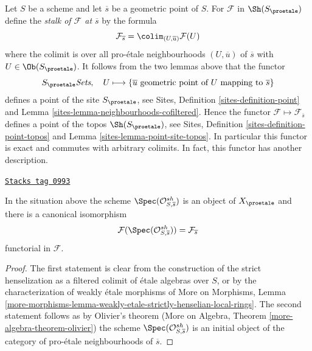Let $S$ be a scheme and let $\overline{s}$ be a geometric point of $S$.
For $\mathcal{F}$ in $\Sh(S_\proetale)$ define the
{\it stalk of $\mathcal{F}$ at $\overline{s}$} by the formula
$$
\mathcal{F}_{\overline{s}} = \colim_{(U, \overline{u})} \mathcal{F}(U)
$$
where the colimit is over all pro-\'etale neighbourhoods $(U, \overline{u})$
of $\overline{s}$ with $U \in \Ob(S_\proetale)$. It follows from the
two lemmas above that the functor
$$
S_\proetale \textit{Sets},\quad
U \longmapsto
\{\overline{u}\text{ geometric point of }U\text{ mapping to }\overline{s}\}
$$
defines a point of the site $S_\proetale$, see
Sites, Definition \ref{sites-definition-point} and
Lemma \ref{sites-lemma-neighbourhoods-cofiltered}.
Hence the functor $\mathcal{F} \mapsto \mathcal{F}_{\overline{s}}$
defines a point of the topos $\Sh(S_\proetale)$, see
Sites, Definition \ref{sites-definition-point-topos} and
Lemma \ref{sites-lemma-point-site-topos}. In particular this
functor is exact and commutes with arbitrary colimits.
In fact, this functor has another description.

\begin{lemma}
\label{proetale-lemma-classical-point}
\href{https://stacks.math.columbia.edu/tag/0993}{\texttt{Stacks tag 0993}}

In the situation above the scheme $\Spec(\mathcal{O}_{S, \overline{s}}^{sh})$
is an object of $X_\proetale$ and there is a canonical isomorphism
$$
\mathcal{F}(\Spec(\mathcal{O}_{S, \overline{s}}^{sh})) =
\mathcal{F}_{\overline{s}}
$$
functorial in $\mathcal{F}$.
\end{lemma}

\begin{proof}
The first statement is clear from the construction of the strict henselization
as a filtered colimit of \'etale algebras over $S$, or by the characterization
of weakly \'etale morphisms of
More on Morphisms, Lemma
\ref{more-morphisms-lemma-weakly-etale-strictly-henselian-local-rings}.
The second statement follows as by Olivier's theorem
(More on Algebra, Theorem \ref{more-algebra-theorem-olivier})
the scheme $\Spec(\mathcal{O}_{S, \overline{s}}^{sh})$
is an initial object of the category of pro-\'etale neighbourhoods
of $\overline{s}$.
\end{proof}

